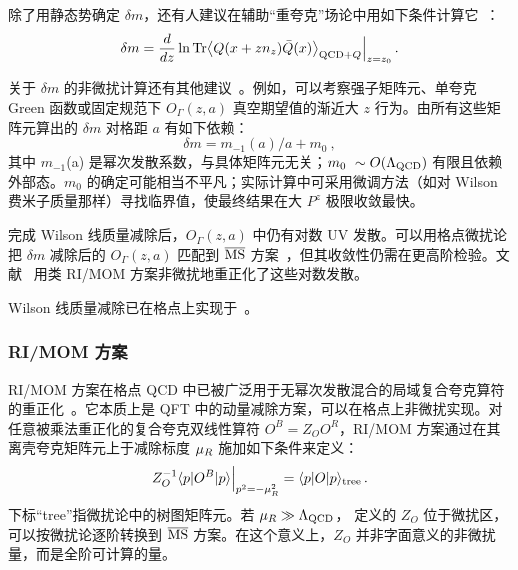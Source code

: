 除了用静态势确定 $\delta m$，还有人建议在辅助``重夸克''场论中用如下条件计算它~\cite{Green:2017xeu}：
\begin{align}\label{eq:deltam3}
	\delta m = {d\over dz} \ln{\rm Tr}\big\langle Q(x+zn_z)\bar{Q}(x)\big\rangle_{{\rm QCD}+Q} \Big|_{z=z_0}\,.
\end{align}

关于 $\delta m$ 的非微扰计算还有其他建议~\cite{Ji:2020brr}。例如，可以考察强子矩阵元、单夸克 Green 函数或固定规范下 $O_{\Gamma}(z,a)$ 真空期望值的渐近大 $z$ 行为。由所有这些矩阵元算出的 $\delta m$ 对格距 $a$ 有如下依赖：
\begin{equation}
	\delta m = m_{-1}(a)/a + m_0 \ ,
\end{equation}
其中 $m_{-1}$(a) 是幂次发散系数，与具体矩阵元无关；$m_0~\sim O(\Lambda_{\rm QCD})$ 有限且依赖外部态。$m_0$ 的确定可能相当不平凡；实际计算中可采用微调方法（如对 Wilson 费米子质量那样）寻找临界值，使最终结果在大 $P^z$ 极限收敛最快。

完成 Wilson 线质量减除后，$O_\Gamma(z,a)$ 中仍有对数 UV 发散。可以用格点微扰论把 $\delta m$ 减除后的 $O_\Gamma(z,a)$ 匹配到 ${\overline{\rm MS}}$ 方案~\cite{Ishikawa:2016znu,Xiong:2017jtn,Constantinou:2017sej}，但其收敛性仍需在更高阶检验。文献~\cite{Green:2017xeu,Green:2020xco} 用类 RI/MOM 方案非微扰地重正化了这些对数发散。

Wilson 线质量减除已在格点上实现于~\cite{Musch:2010ka,Zhang:2017bzy,Green:2017xeu,Chen:2017gck,Alexandrou:2020qtt}。

\subsubsection{RI/MOM 方案}
\label{sec:renorm-npr-rimom}

RI/MOM 方案在格点 QCD 中已被广泛用于无幂次发散混合的局域复合夸克算符的重正化~\cite{Martinelli:1994ty}。它本质上是 QFT 中的动量减除方案，可以在格点上非微扰实现。对任意被乘法重正化的复合夸克双线性算符 $O^B=Z_OO^R$，RI/MOM 方案通过在其离壳夸克矩阵元上于减除标度 $\mu_{\tiny R}$ 施加如下条件来定义：
\begin{align} \label{eq:rimom}
	Z^{-1}_O \langle p|O^B|p\rangle \Big|_{p^2=-\mu_{\tiny R}^2}= \langle p|O|p\rangle_{\rm tree}\,.
\end{align}
下标``tree''指微扰论中的树图矩阵元。若 $\mu_{\tiny R} \gg \Lambda_{\rm QCD}$， 定义的 $Z_O$ 位于微扰区，可以按微扰论逐阶转换到 ${\overline{\rm MS}}$ 方案。在这个意义上，$Z_O$ 并非字面意义的非微扰量，而是全阶可计算的量。

